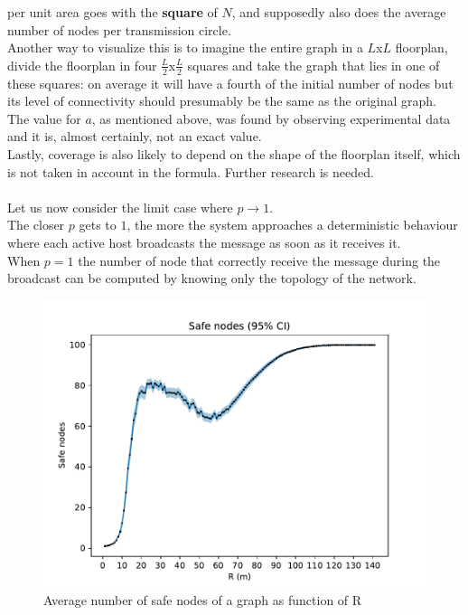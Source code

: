 per unit area goes with the \textbf{square} of $N$, and supposedly also does
the average number of nodes per transmission circle.\\
Another way to visualize this is to imagine the entire graph in a $L$x$L$
floorplan, divide the floorplan in four $\frac{L}{2}$x$\frac{L}{2}$ squares and
take the graph that lies in one of these squares: on average it will have a
fourth of the initial number of nodes but its level of connectivity should
presumably be the same as the original graph.\\
The value for $a$, as mentioned above, was found by observing experimental data
and it is, almost certainly, not an exact value.\\
Lastly, coverage is also likely to depend on the shape of the floorplan itself,
which is not taken in account in the formula. Further research is needed.\\
\\
Let us now consider the limit case where $p \to 1$.\\
The closer $p$ gets to $1$, the more the system approaches a deterministic
behaviour where each active host broadcasts the message as soon as it receives it.\\
When $p=1$ the number of node that correctly receive the message during the
broadcast can be computed by knowing only the topology of the network.\\
\begin{figure}[H]
    \begin{center}
        \includegraphics[scale=.6]{img/graphAnalysisSafe_nodes.pdf}
    \end{center}
    \vspace*{-0.5cm}
    \caption{Average number of safe nodes of a graph as function of R}
    \label{fig:safeNodes}
\end{figure}
